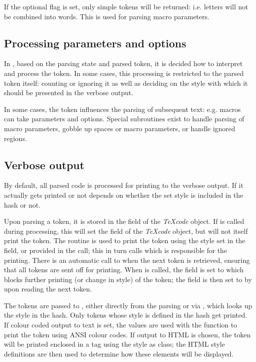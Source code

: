 \documentclass{article}
\newcommand\Obj[1]{\textsl{#1}}
\begin{document}
If the optional  flag is set, only simple tokens will be returned: i.e. letters will not be combined into words. This is used for parsing macro parameters.


\subsection{Processing parameters and options}

In , based on the parsing state and parsed token, it is decided how to interpret and process the token. In some cases, this processing is restricted to the parsed token itself: counting or ignoring it as well as deciding on the style with which it should be presented in the verbose output.

In some cases, the token influences the parsing of subsequent text: e.g. macros can take parameters and options. Special subroutines exist to handle parsing of macro parameters, gobble up spaces or macro parameters, or handle ignored regions.


\subsection{Verbose output}

By default, all parsed code is processed for printing to the verbose output. If it actually gets printed or not depends on whether the set style is included in the  hash or not.

Upon parsing a token, it is stored in the  field of the \Obj{TeXcode} object. If  is called during processing, this will set the  field of the \Obj{TeXcode} object, but will not itself print the token. The  routine is used to print the  token using the style set in the  field, or provided in the call; this in turn calls  which is responsible for the printing. There is an automatic call to  when the next token is retrieved, ensuring that all tokens are sent off for printing. When  is called, the  field is set to  which blocks further printing (or change in style) of the token; the  field is then set to  by  upon reading the next token.

The tokens are passed to , either directly from the parsing or via , which looks up the style in the  hash. Only tokens whose style is defined in the  hash get printed. If colour coded output to text is set, the values  are used with the  function to print the token using ANSI colour codes. If output to HTML is chosen, the token will be printed enclosed in a  tag using the style as class; the HTML style definitions are then used to determine how these elements will be displayed.
\end{document}
